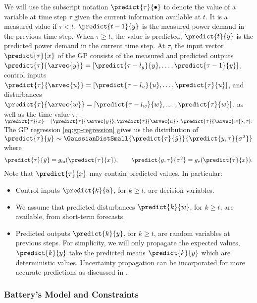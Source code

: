 We will use the subscript notation \(\predict{\tau}{\bullet}\) to denote the value of a variable at time step \(\tau\) given the current information available at \(t\).
It is a measured value if \(\tau < t\), \eg \(\predict{t-1}{y}\) is the measured power demand in the previous time step.
When \(\tau \geq t\), the value is predicted, \eg \(\predict{t}{y}\) is the predicted power demand in the current time step.
At \(\tau\), the input vector \(\predict{\tau}{x}\) of the GP consists of the measured and predicted outputs \(\predict{\tau}{\arvec{y}} = [\predict{\tau-l_{y}}{y}, \dots, \predict{\tau-1}{y}]\), control inputs \(\predict{\tau}{\arvec{u}} = [\predict{\tau-l_{u}}{u}, \dots, \predict{\tau}{u}]\), and disturbances \(\predict{\tau}{\arvec{w}} = [\predict{\tau-l_{w}}{w}, \dots, \predict{\tau}{w}]\), as well as the time value \(\tau\):
\(\predict{\tau}{x} = \left[\predict{\tau}{\arvec{y}}, \predict{\tau}{\arvec{u}}, \predict{\tau}{\arvec{w}}, \tau \right] \text.\)
The GP regression \eqref{eq:gp-regression} gives us  the distribution of  \(\predict{\tau}{y} \sim \GaussianDistSmall{\predict{\tau}{\bar{y}}}{\predict{y,\tau}{\sigma^2}}\) where
\begin{gather}
  \predict{\tau}{\bar{y}} = g_{\textrm{m}} (\predict{\tau}{x}), \qquad 
  \predict{y,\tau}{\sigma^2} = g_{\textrm{v}} (\predict{\tau}{x}) \text. \label{eq:building-gp-model}
\end{gather}
Note that \(\predict{\tau}{x}\) may contain predicted values.
In particular:
\begin{itemize}
\item Control inputs \(\predict{k}{u}\), for \(k \geq t\), are decision variables.
\item We assume that predicted disturbances \(\predict{k}{w}\), for \(k \geq t\), are available, \eg from short-term forecasts.
\item Predicted outputs \(\predict{k}{y}\), for \(k \geq t\), are random variables at previous steps.  For simplicity, we will only propagate the expected values, \ie \(\predict{k}{y}\) take the predicted means \(\predict{k}{\bar{y}}\) which are deterministic values.  Uncertainty propagation can be incorporated  for more accurate predictions as discussed in \cite{Kocijan2016,girard04approximate}.
\end{itemize}


\subsubsection{Battery's Model and Constraints}

